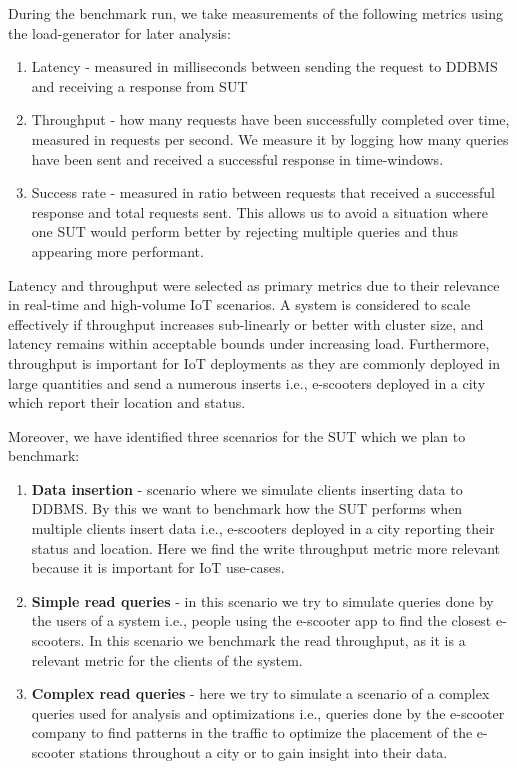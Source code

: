 During the benchmark run, we take measurements of the following metrics using the load-generator for later analysis:
\begin{enumerate}
	\item Latency - measured in milliseconds between sending the request to DDBMS and receiving a response from SUT
	\item Throughput - how many requests have been successfully completed over time, measured in requests per second.
		We measure it by logging how many queries have been sent and received a successful response in time-windows.
	\item Success rate - measured in ratio between requests that received a successful response and total requests sent.
		This allows us to avoid a situation where one SUT would perform better by rejecting multiple queries and thus appearing more performant.
\end{enumerate}

Latency and throughput were selected as primary metrics due to their relevance in real-time and high-volume IoT scenarios.
A system is considered to scale effectively if throughput increases sub-linearly or better with cluster size, and latency remains within acceptable bounds under increasing load.\cite{hossfeldComparingScalabilityCommunication2023}
Furthermore, throughput is important for IoT deployments as they are commonly deployed in large quantities and send a numerous inserts i.e., e-scooters deployed in a city which report their location and status.

Moreover, we have identified three scenarios for the SUT which we plan to benchmark:
\begin{enumerate}
	\item \textbf{Data insertion} - scenario where we simulate clients inserting data to DDBMS.
By this we want to benchmark how the SUT performs when multiple clients insert data i.e., e-scooters deployed in a city reporting their status and location.
Here we find the write throughput metric more relevant because it is important for IoT use-cases.
	\item \textbf{Simple read queries} - in this scenario we try to simulate queries done by the users of a system i.e., people using the e-scooter app to find the closest e-scooters.
		In this scenario we benchmark the read throughput, as it is a relevant metric for the clients of the system.
	\item \textbf{Complex read queries} - here we try to simulate a scenario of a complex queries used for analysis and optimizations i.e., queries done by the e-scooter company to find patterns in the traffic to optimize the placement of the e-scooter stations throughout a city or to gain insight into their data.
\end{enumerate}

